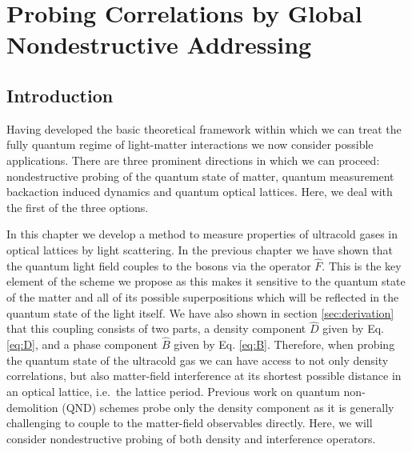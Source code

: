 
\chapter{Probing Correlations by Global 
Nondestructive Addressing} %
\label{chap:qnd}

\ifpdf
    \graphicspath{{Chapter3/Figs/Raster/}{Chapter3/Figs/PDF/}{Chapter3/Figs/}}
\else
    \graphicspath{{Chapter3/Figs/Vector/}{Chapter3/Figs/}}
\fi



\section{Introduction}

Having developed the basic theoretical framework within which we can
treat the fully quantum regime of light-matter interactions we now
consider possible applications. There are three prominent directions
in which we can proceed: nondestructive probing of the quantum state
of matter, quantum measurement backaction induced dynamics and quantum
optical lattices. Here, we deal with the first of the three options.

In this chapter we develop a method to measure properties of ultracold
gases in optical lattices by light scattering. In the previous chapter
we have shown that the quantum light field couples to the bosons via
the operator $\hat{F}$. This is the key element of the scheme we
propose as this makes it sensitive to the quantum state of the matter
and all of its possible superpositions which will be reflected in the
quantum state of the light itself. We have also shown in section
\ref{sec:derivation} that this coupling consists of two parts, a
density component $\hat{D}$ given by Eq. \eqref{eq:D}, and a phase
component $\hat{B}$ given by Eq. \eqref{eq:B}. Therefore, when probing
the quantum state of the ultracold gas we can have access to not only
density correlations, but also matter-field interference at its
shortest possible distance in an optical lattice, i.e.~the lattice
period. Previous work on quantum non-demolition (QND) schemes
\cite{rogers2014, mekhov2007prl, eckert2008} probe only the density
component as it is generally challenging to couple to the matter-field
observables directly. Here, we will consider nondestructive probing of
both density and interference operators.

